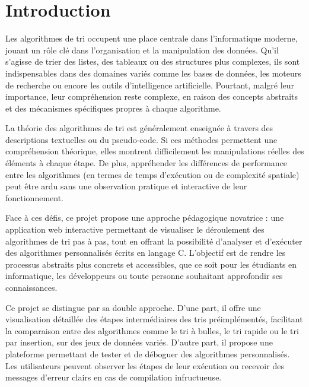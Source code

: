 \documentclass[a4paper, 12pt, twoside]{article}
\begin{document}
\tableofcontents
\newpage

\section{Introduction}
\vspace{60pt} %
Les algorithmes de tri occupent une place centrale dans l’informatique moderne, jouant un rôle clé dans l’organisation et la manipulation des données. Qu’il s’agisse de trier des listes, des tableaux ou des structures plus complexes, ils sont indispensables dans des domaines variés comme les bases de données, les moteurs de recherche ou encore les outils d’intelligence artificielle. Pourtant, malgré leur importance, leur compréhension reste complexe, en raison des concepts abstraits et des mécanismes spécifiques propres à chaque algorithme.
\newline

La théorie des algorithmes de tri est généralement enseignée à travers des descriptions textuelles ou du pseudo-code. Si ces méthodes permettent une compréhension théorique, elles montrent difficilement les manipulations réelles des éléments à chaque étape. De plus, appréhender les différences de performance entre les algorithmes (en termes de temps d’exécution ou de complexité spatiale) peut être ardu sans une observation pratique et interactive de leur fonctionnement.
\newline

Face à ces défis, ce projet propose une approche pédagogique novatrice : une application web interactive permettant de visualiser le déroulement des algorithmes de tri pas à pas, tout en offrant la possibilité d’analyser et d’exécuter des algorithmes personnalisés écrits en langage C. L’objectif est de rendre les processus abstraits plus concrets et accessibles, que ce soit pour les étudiants en informatique, les développeurs ou toute personne souhaitant approfondir ses connaissances.
\vspace{12pt} %
\newline

Ce projet se distingue par sa double approche. D’une part, il offre une visualisation détaillée des étapes intermédiaires des tris préimplémentés, facilitant la comparaison entre des algorithmes comme le tri à bulles, le tri rapide ou le tri par insertion, sur des jeux de données variés. D’autre part, il propose une plateforme permettant de tester et de déboguer des algorithmes personnalisés. Les utilisateurs peuvent observer les étapes de leur exécution ou recevoir des messages d’erreur clairs en cas de compilation infructueuse.
\vspace{12pt} %
\newline
\end{document}
